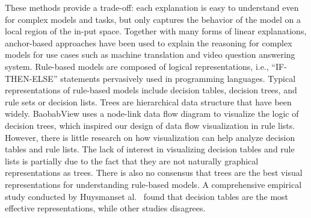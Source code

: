 \hspace*{3.5mm} These methods provide a trade-off: each explanation is easy to understand even for complex models and tasks, but only captures the behavior of the model on a local region of the in-put space. Together with many forms of linear explanations, anchor-based approaches have been used to explain the reasoning for complex models for use cases such as machine translation and video question answering system. Rule-based models are composed of logical representations, i.e., ``IF-THEN-ELSE'' statements pervasively used in programming languages. Typical representations of rule-based models include decision tables, decision trees, and rule sets or decision lists. Trees are hierarchical data structure that have been widely. BaobabView uses a node-link data flow diagram to visualize the logic of decision trees, which inspired our design of data flow visualization in rule lists. 
However, there is little research on how visualization can help analyze decision tables and rule lists. The lack of interest in visualizing decision tables and rule lists is partially due to the fact that they are not naturally graphical representations as trees. There is also no consensus that trees are the best visual representations for understanding rule-based models. A comprehensive empirical study conducted by Huysmanset al.~\cite{mehrabi2019survey} found that decision tables are the most effective representations, while other studies disagrees.


